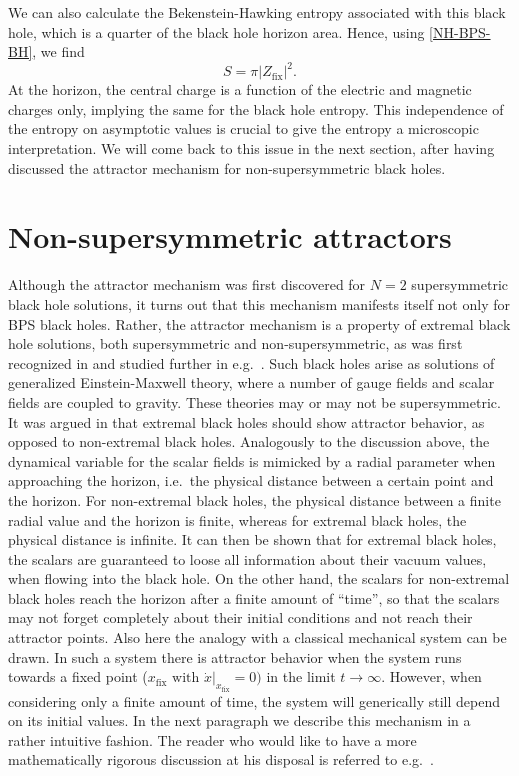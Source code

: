 \documentclass[12pt,twoside]{book}
\begin{document}
We can also calculate the Bekenstein-Hawking entropy associated with this black hole, which is a quarter of the black hole horizon area. Hence, using \eqref{NH-BPS-BH}, we find
\begin{equation}
S = \pi |Z_{\mathrm{fix}}|^{2}.
\end{equation}
At the horizon, the central charge is a function of the electric and magnetic charges only, implying the same for the black hole entropy. This independence of the entropy on asymptotic values is crucial to give the entropy a microscopic interpretation. We will come back to this issue in the next section, after having discussed the attractor mechanism for non-supersymmetric black holes.

\section{Non-supersymmetric attractors}

Although the attractor mechanism was first discovered for $N=2$ supersymmetric black hole solutions, it turns out that this mechanism manifests itself not only for BPS black holes. Rather, the attractor mechanism is a property of extremal black hole solutions, both supersymmetric and non-supersymmetric, as was first recognized in \cite{Ferrara:fk} and studied further in e.g.\ \cite{Goldstein:fk,Kallosh:uq}. Such black holes arise as solutions of generalized Einstein-Maxwell theory, where a number of gauge fields and scalar fields are coupled to gravity. These theories may or may not be supersymmetric. It was argued in \cite{Kallosh:uq} that extremal black holes should show attractor behavior, as opposed to non-extremal black holes. Analogously to the discussion above, the dynamical variable for the scalar fields is mimicked by a radial parameter when approaching the horizon, i.e.\ the physical distance between a certain point and the horizon. For non-extremal black holes, the physical distance between a finite radial value and the horizon is finite, whereas for extremal black holes, the physical distance is infinite. It can then be shown that for extremal black holes, the scalars are guaranteed to loose all information about their vacuum values, when flowing into the black hole. On the other hand, the scalars for non-extremal black holes reach the horizon after a finite amount of ``time'', so that the scalars may not forget completely about their initial conditions and not reach their attractor points. Also here the analogy with a classical mechanical system can be drawn. In such a system there is attractor behavior when the system runs towards a fixed point ($x_{\mathrm{fix}} \text{ with } \dot{x}|_{x_{\mathrm{fix}}} = 0)$ in the limit $t \rightarrow \infty$. However, when considering only a finite amount of time, the system will generically still depend on its initial values. In the next paragraph we describe this mechanism in a rather intuitive fashion. The reader who would like to have a more mathematically rigorous discussion at his disposal is referred to e.g.\ \cite{Goldstein:fk,Kallosh:uq,Tripathy:fk}.
\end{document}
